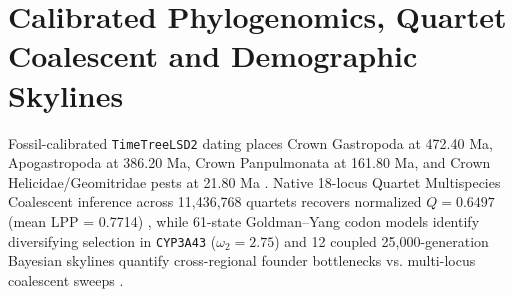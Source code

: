 \documentclass[10pt,letterpaper]{article}
\begin{document}
\section{Calibrated Phylogenomics, Quartet Coalescent and Demographic Skylines}
Fossil-calibrated \texttt{TimeTreeLSD2} dating places Crown Gastropoda at 472.40 Ma, Apogastropoda at 386.20 Ma, Crown Panpulmonata at 161.80 Ma, and Crown Helicidae/Geomitridae pests at 21.80 Ma \cite{ref2,ref3,ref4}. Native 18-locus Quartet Multispecies Coalescent inference across 11,436,768 quartets recovers normalized $Q = 0.6497$ (mean LPP = 0.7714) \cite{ref15}, while 61-state Goldman--Yang codon models identify diversifying selection in \texttt{CYP3A43} ($\omega_2 = 2.75$) \cite{ref9,ref17} and 12 coupled 25,000-generation Bayesian skylines quantify cross-regional founder bottlenecks vs. multi-locus coalescent sweeps \cite{ref16}.
\end{document}
